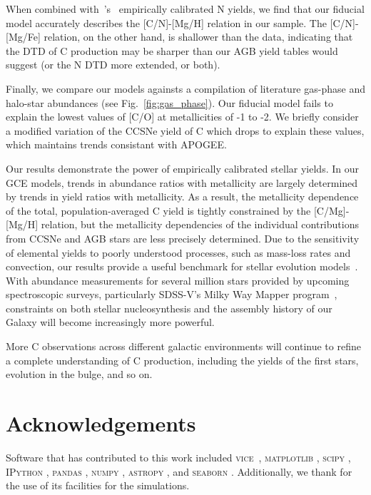 \documentclass[fleqn,
usenatbib]{mnras}
\newcommand{\VICE}{\textsc{vice}}
\begin{document}
When combined with~\citeauthor{james+23}'s~\citeyearpar{james+23} empirically calibrated N yields, we find that our fiducial model accurately describes the [C/N]-[Mg/H] relation in our sample. The [C/N]-[Mg/Fe] relation, on the other hand, is shallower than the data, indicating that the DTD of C production may be sharper than our AGB yield tables would suggest (or the N DTD more extended, or both).

Finally, we compare our models againsts a compilation of literature gas-phase and halo-star abundances (see Fig.~\ref{fig:gas_phase}). Our fiducial model fails to explain the lowest values of [C/O] at metallicities of -1 to -2. We briefly consider a modified variation of the CCSNe yield of C which drops to explain these values, which maintains trends consistant with APOGEE. 


Our results demonstrate the power of empirically calibrated stellar yields. In our GCE models, trends in abundance ratios with metallicity are largely determined by trends in yield ratios with metallicity. As a result, the metallicity dependence of the total, population-averaged C yield is tightly constrained by the [C/Mg]-[Mg/H] relation, but the metallicity dependencies of the individual contributions from CCSNe and AGB stars are less precisely determined. Due to the sensitivity of elemental yields to poorly understood processes, such as mass-loss rates and convection, our results provide a useful benchmark for stellar evolution models~\citep[see the discussion in e.g.][]{gil-pons+2022}. With abundance measurements for several million stars provided by upcoming spectroscopic surveys, particularly SDSS-V's Milky Way Mapper program~\citep{sdssv}, constraints on both stellar nucleosynthesis and the assembly history of our Galaxy will become increasingly more powerful.

More C observations across different galactic environments will continue to refine a complete understanding of C production, including the yields of the first stars,  evolution in the bulge, and so on. 



\section*{Acknowledgements}

Software that has contributed to this work included  
\VICE~\citep{JW20, james+21},
\textsc{matplotlib} \citep{matplotlib},
\textsc{scipy} \citep{scipy},
\textsc{IPython} \citep{ipy},
\textsc{pandas} \citep{pandas},
\textsc{numpy} \citep{numpy},
\textsc{astropy} \citep{astropy:2013, astropy:2018, astropy:2022},
and 
\textsc{seaborn} \citep{seaborn}
.
Additionally, we thank \citet{OhioSupercomputerCenter1987} for the use of its facilities for the simulations. 
\end{document}
